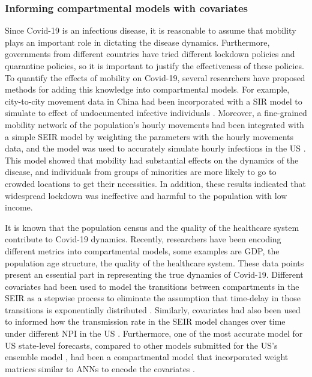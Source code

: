 \subsubsection{Informing compartmental models with covariates}

Since Covid-19 is an infectious disease, it is reasonable to assume that mobility plays an important role in dictating the disease dynamics.
Furthermore, governments from different countries have tried different lockdown policies and quarantine policies, so it is important to justify the effectiveness of these policies.
To quantify the effects of mobility on Covid-19, several researchers have proposed methods for adding this knowledge into compartmental models.
For example, city-to-city movement data in China had been incorporated with a \gls{SIR} model to simulate to effect of undocumented infective individuals \cite{liSubstantialUndocumentedInfection2020}.
Moreover, a fine-grained mobility network of the population's hourly movements had been integrated with a simple \gls{SEIR} model by weighting the parameters with the hourly movements data, and the model was used to accurately simulate hourly infections in the US \cite{changMobilityNetworkModels2021}.
This model showed that mobility had substantial effects on the dynamics of the disease, and individuals from groups of minorities are more likely to go to crowded locations to get their necessities.
In addition, these results indicated that widespread lockdown was ineffective and harmful to the population with low income.

It is known that the population census and the quality of the healthcare system contribute to Covid-19 dynamics.
Recently, researchers have been encoding different metrics into compartmental models, some examples are \gls{GDP}, the population age structure, the quality of the healthcare system.
These data points present an essential part in representing the true dynamics of Covid-19.
Different covariates had been used to model the transitions between compartments in the \gls{SEIR} as a stepwise process to eliminate the assumption that time-delay in those transitions is exponentially distributed \cite{schneiderCOVID19PandemicPreparedness2020}.
Similarly, covariates had also been used to informed how the transmission rate in the \gls{SEIR} model changes over time under different \gls{NPI} in the \gls{US} \cite{ihmecovid-19forecastingteamModelingCOVID19Scenarios2021}.
Furthermore, one of the most accurate model for \gls{US} state-level forecasts, compared to other models submitted for the \gls{US}’s ensemble model \cite{rayEnsembleForecastsCoronavirus2020}, had been a compartmental model that incorporated weight matrices similar to \glspl{ANN} to encode the covariates \cite{arikInterpretableSequenceLearning}.


